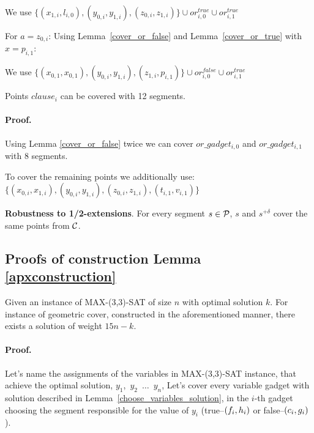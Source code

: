 We use 
$\{ (x_{1, i}, l_{i, 0}), (y_{0, i}, y_{1, i}),
(z_{0, i}, z_{1, i}) \} \cup or^{true}_{i, 0} \cup or^{true}_{i, 1}$

For $a = z_{0, i}$:
Using Lemma~\ref{cover_or_false} and Lemma~\ref{cover_or_true} with $x = p_{i, 1}$:

We use 
$\{ (x_{0, 1}, x_{0, 1}), (y_{0, i}, y_{1, i}),
(z_{1, i}, p_{i, 1}) \} \cup or^{false}_{i, 0} \cup or^{true}_{i, 1}$


\begin{lemma}
 Points $clause_i$ can be covered with 12 segments.
\end{lemma}

\paragraph{Proof.}
Using Lemma \ref{cover_or_false} twice we can
cover $or\_gadget_{i,0}$ and  $or\_gadget_{i,1}$
with 8 segments.

To cover the remaining points we additionally use:
$\{ (x_{0, i}, x_{1, i}), (y_{0, i}, y_{1, i}),
(z_{0, i}, z_{1, i}), (t_{i, 1}, v_{i, 1}) \}$

\begin{lemma}
\textbf{Robustness to 1/2-extensions}. For every segment $s \in \mathcal{P}$,
$s$ and $s^{+\delta}$ cover the same points from $\mathcal{C}$.
\end{lemma}

\subsection{Proofs of construction Lemma \ref{apxconstruction}}
\begin{lemma}
	\label{construction_correctness}
	Given an instance of MAX-(3,3)-SAT of size $n$
	with optimal solution $k$.
	For instance of geometric cover, constructed
	in the aforementioned manner, 
	there exists a solution of weight $15n - k$.
\end{lemma}
\paragraph{Proof.}
Let's name the assignments of the variables in MAX-(3,3)-SAT instance,
that achieve the optimal solution,
$y_1$,~$y_2$~$\ldots$~$y_n$,
Let's cover every variable gadget with solution described in
Lemma~\ref{choose_variables_solution},
in the $i$-th gadget choosing the segment responsible for the
value of $y_i$
(true--$(f_i, h_i)$ or false--$(c_i, g_i)$).

